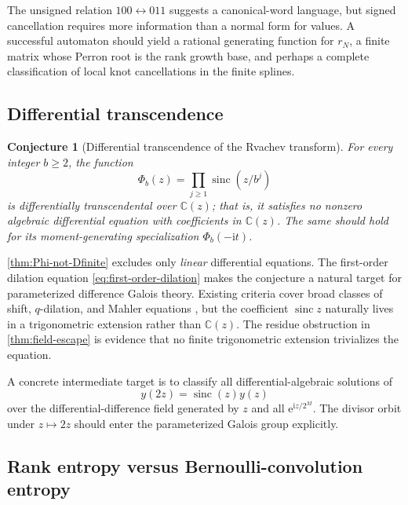 \documentclass[11pt]{article}
\numberwithin{equation}{section}
\newtheorem{conjecture}[theorem]{Conjecture}
\theoremstyle{definition}
\theoremstyle{remark}
\newcommand{\C}{\mathbb C}
\newcommand{\ii}{\mathrm i}
\newcommand{\e}{\mathrm e}
\newcommand{\sinc}{\operatorname{sinc}}
\begin{document}
The unsigned relation $100\leftrightarrow011$ suggests a canonical-word
language, but signed cancellation requires more information than a normal form
for values.  A successful automaton should yield a rational generating
function for $r_N$, a finite matrix whose Perron root is the rank growth base,
and perhaps a complete classification of local knot cancellations in the
finite splines.

\subsection{Differential transcendence}

\begin{conjecture}[Differential transcendence of the Rvachev transform]
\label{conj:differential-transcendence}
For every integer $b\ge2$, the function
\begin{equation}
 \Phi_b(z)=\prod_{j\ge1}\sinc(z/b^j)
 \label{eq:DT-conjecture-function}
\end{equation}
is differentially transcendental over $\C(z)$; that is, it satisfies no
nonzero algebraic differential equation with coefficients in $\C(z)$.
The same should hold for its moment-generating specialization
$\Phi_b(-\ii t)$.
\end{conjecture}

\cref{thm:Phi-not-Dfinite} excludes only \emph{linear} differential equations.
The first-order dilation equation \eqref{eq:first-order-dilation} makes the
conjecture a natural target for parameterized difference Galois theory.
Existing criteria cover broad classes of shift, $q$-dilation, and Mahler
equations \cite{ArrecheDreyfusRoques,AdamczewskiDreyfusHardouinWibmer}, but the
coefficient $\sinc z$ naturally lives in a trigonometric extension rather than
$\C(z)$.  The residue obstruction in \cref{thm:field-escape} is evidence that no
finite trigonometric extension trivializes the equation.

A concrete intermediate target is to classify all differential-algebraic
solutions of
\begin{equation}
 y(2z)=\sinc(z)y(z)
 \label{eq:dilation-DT-target}
\end{equation}
over the differential-difference field generated by
$z$ and all $\e^{\ii z/2^M}$.  The divisor orbit under $z\mapsto2z$ should enter
the parameterized Galois group explicitly.

\subsection{Rank entropy versus Bernoulli-convolution entropy}
\end{document}
